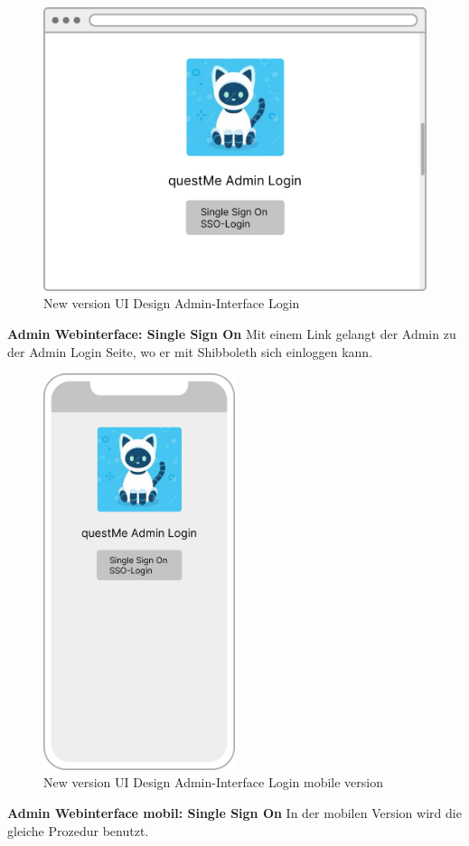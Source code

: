 \begin{figure}[H]
    \centering
    \includegraphics[width=1.0\textwidth]{bilder/new vers. UI Design/Login SSO/Admin Interface SSO.png}
    \caption{New version UI Design Admin-Interface Login}
    \label{fig:New version UI Design Admin-Interface Login}
\end{figure}
\noindent \textbf{Admin Webinterface: Single Sign On} \newline
Mit einem Link gelangt der Admin zu der Admin Login Seite, wo er mit Shibboleth sich einloggen kann. 

\begin{figure}[H]
    \centering
    \includegraphics[width=0.5\textwidth]{bilder/new vers. UI Design/Login SSO/Interface SSO v1.2.png}
    \caption{New version UI Design Admin-Interface Login mobile version}
    \label{fig:New version UI Design Admin-Interface Login mobile version}
\end{figure}
\noindent \textbf{Admin Webinterface mobil: Single Sign On} \newline
In der mobilen Version wird die gleiche Prozedur benutzt.

